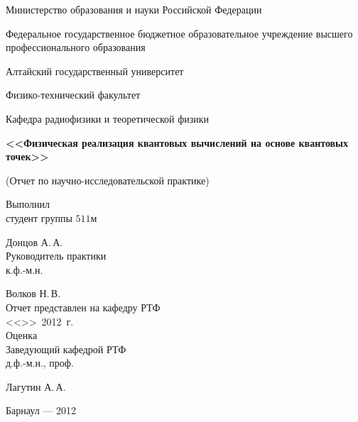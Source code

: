 \documentclass[14pt,a4paper]{PhDthesis}
\begin{document}
\thispagestyle{empty}
\begin{center}
\enlargethispage{3cm}

{\Large\sc Министерство образования и науки Российской Федерации}

\bigskip
{\large Федеральное государственное бюджетное образовательное учреждение высшего профессионального образования}

{\large Алтайский государственный университет}

\bigskip
{\large Физико-технический факультет}

\bigskip
{Кафедра радиофизики и теоретической физики }
\bigskip

\vfill
\vfill
{\Large\sf\bf <<Физическая реализация квантовых вычислений на основе квантовых точек>>}
\bigskip

{\sf (Отчет по научно-исследовательской практике)}


\vfill
\hfill
\parbox[b]{7cm}{\raggedright
Выполнил\\
студент группы $511$м \\
{}\rule{0pt}{2ex}\hrulefill Донцов А.\,А.\\
Руководитель практики\\
к.ф.-м.н.\\
{}\rule{0pt}{2ex}\hrulefill Волков Н.\,В.\\
Отчет представлен на кафедру РТФ\\
{}<<\makebox[2em]{\rule{0pt}{4ex}\hrulefill}>>\hrulefill \ 2012\ г.\\
Оценка \hrulefill\\
Заведующий кафедрой РТФ\\
д.ф.-м.н., проф. \\
{}\rule{0pt}{2ex}\hrulefill Лагутин А.\,А.\\
}

\vfill
\vfill

\center
Барнаул --- 2012
\end{center}
\newpage
\tableofcontents
\newpage
\setcounter{chapter}{1}
\end{document}
